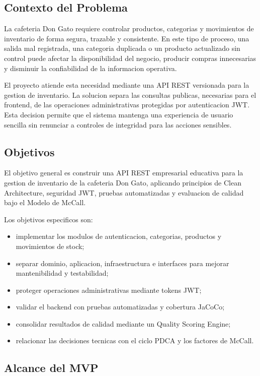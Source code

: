 \documentclass[11pt,oneside]{article}
\begin{document}
\subsection{Contexto del Problema}

La cafeteria Don Gato requiere controlar productos, categorias y movimientos de inventario de forma segura, trazable y consistente. En este tipo de proceso, una salida mal registrada, una categoria duplicada o un producto actualizado sin control puede afectar la disponibilidad del negocio, producir compras innecesarias y disminuir la confiabilidad de la informacion operativa.

El proyecto atiende esta necesidad mediante una API REST versionada para la gestion de inventario. La solucion separa las consultas publicas, necesarias para el frontend, de las operaciones administrativas protegidas por autenticacion JWT. Esta decision permite que el sistema mantenga una experiencia de usuario sencilla sin renunciar a controles de integridad para las acciones sensibles.

\subsection{Objetivos}

El objetivo general es construir una API REST empresarial educativa para la gestion de inventario de la cafeteria Don Gato, aplicando principios de Clean Architecture, seguridad JWT, pruebas automatizadas y evaluacion de calidad bajo el Modelo de McCall.

Los objetivos especificos son:

\begin{itemize}
  \item implementar los modulos de autenticacion, categorias, productos y movimientos de stock;
  \item separar dominio, aplicacion, infraestructura e interfaces para mejorar mantenibilidad y testabilidad;
  \item proteger operaciones administrativas mediante tokens JWT;
  \item validar el backend con pruebas automatizadas y cobertura JaCoCo;
  \item consolidar resultados de calidad mediante un Quality Scoring Engine;
  \item relacionar las decisiones tecnicas con el ciclo PDCA y los factores de McCall.
\end{itemize}

\subsection{Alcance del MVP}
\end{document}

